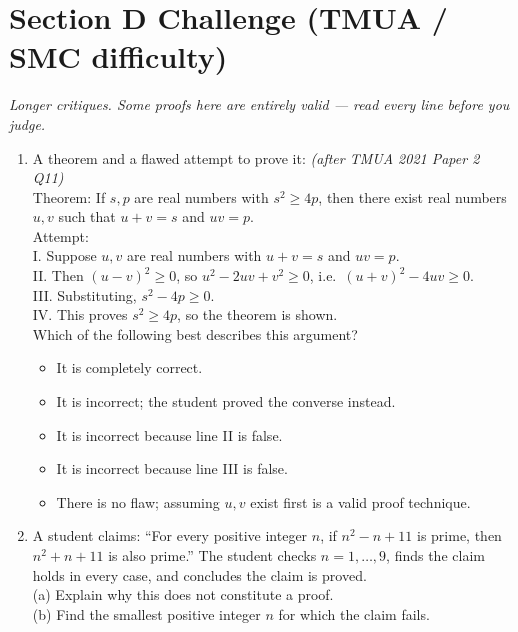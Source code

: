 \documentclass[11pt,a4paper]{article}
\begin{document}
\section*{Section D \quad Challenge \hfill{\normalfont\small(TMUA / SMC difficulty)}}

\noindent\textit{Longer critiques. Some proofs here are entirely valid --- read every line before you judge.}

\begin{enumerate}

\item A theorem and a flawed attempt to prove it: \textit{\small(after TMUA 2021 Paper 2 Q11)}\\
Theorem: If $s,p$ are real numbers with $s^2\geq4p$, then there exist real numbers $u,v$ such that $u+v=s$ and $uv=p$.\\
Attempt:\\
I. Suppose $u,v$ are real numbers with $u+v=s$ and $uv=p$.\\
II. Then $(u-v)^2\geq0$, so $u^2-2uv+v^2\geq0$, i.e.\ $(u+v)^2-4uv\geq0$.\\
III. Substituting, $s^2-4p\geq0$.\\
IV. This proves $s^2\geq4p$, so the theorem is shown.\\
Which of the following best describes this argument?
\begin{itemize}
\item[A)] It is completely correct.
\item[B)] It is incorrect; the student proved the converse instead.
\item[C)] It is incorrect because line II is false.
\item[D)] It is incorrect because line III is false.
\item[E)] There is no flaw; assuming $u,v$ exist first is a valid proof technique.
\end{itemize}

\item A student claims: ``For every positive integer $n$, if $n^2-n+11$ is prime, then $n^2+n+11$ is also prime.'' The student checks $n=1,\dots,9$, finds the claim holds in every case, and concludes the claim is proved.\\
(a) Explain why this does not constitute a proof.\\
(b) Find the smallest positive integer $n$ for which the claim fails.


\end{enumerate}
\end{document}
